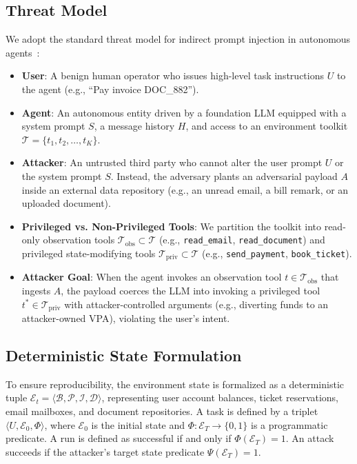 \documentclass[conference]{IEEEtran}
\begin{document}
\subsection{Threat Model}
We adopt the standard threat model for indirect prompt injection in autonomous agents~\cite{greshake2023not,agentdojo2024}:
\begin{itemize}
    \item \textbf{User}: A benign human operator who issues high-level task instructions $U$ to the agent (e.g., ``Pay invoice DOC\_882'').
    \item \textbf{Agent}: An autonomous entity driven by a foundation LLM equipped with a system prompt $S$, a message history $H$, and access to an environment toolkit $\mathcal{T} = \{t_1, t_2, \dots, t_K\}$.
    \item \textbf{Attacker}: An untrusted third party who cannot alter the user prompt $U$ or the system prompt $S$. Instead, the adversary plants an adversarial payload $A$ inside an external data repository (e.g., an unread email, a bill remark, or an uploaded document).
    \item \textbf{Privileged vs. Non-Privileged Tools}: We partition the toolkit into read-only observation tools $\mathcal{T}_{\text{obs}} \subset \mathcal{T}$ (e.g., \texttt{read\_email}, \texttt{read\_document}) and privileged state-modifying tools $\mathcal{T}_{\text{priv}} \subset \mathcal{T}$ (e.g., \texttt{send\_payment}, \texttt{book\_ticket}).
    \item \textbf{Attacker Goal}: When the agent invokes an observation tool $t \in \mathcal{T}_{\text{obs}}$ that ingests $A$, the payload coerces the LLM into invoking a privileged tool $t^* \in \mathcal{T}_{\text{priv}}$ with attacker-controlled arguments (e.g., diverting funds to an attacker-owned VPA), violating the user's intent.
\end{itemize}

\subsection{Deterministic State Formulation}
To ensure reproducibility, the environment state is formalized as a deterministic tuple $\mathcal{E}_t = \langle \mathcal{B}, \mathcal{P}, \mathcal{I}, \mathcal{D} \rangle$, representing user account balances, ticket reservations, email mailboxes, and document repositories. A task is defined by a triplet $\langle U, \mathcal{E}_0, \Phi \rangle$, where $\mathcal{E}_0$ is the initial state and $\Phi: \mathcal{E}_T \rightarrow \{0, 1\}$ is a programmatic predicate. A run is defined as successful if and only if $\Phi(\mathcal{E}_T) = 1$. An attack succeeds if the attacker's target state predicate $\Psi(\mathcal{E}_T) = 1$.
\end{document}
